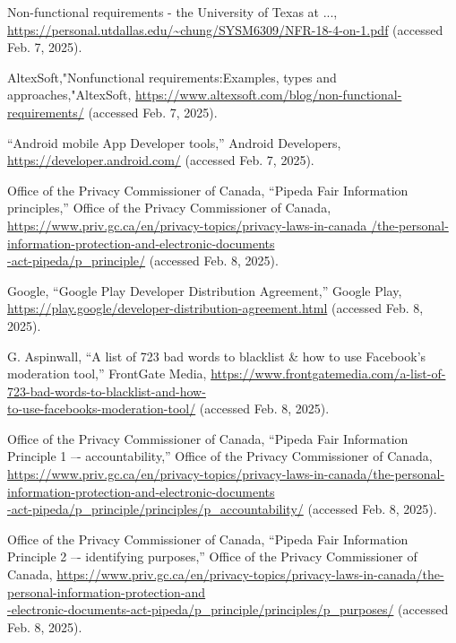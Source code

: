 \documentclass[]{article}
\begin{document}
\begin{thebibliography}{99}
     Non-functional requirements - the University of Texas at ..., 
    \url{https://personal.utdallas.edu/~chung/SYSM6309/NFR-18-4-on-1.pdf} 
    (accessed Feb. 7, 2025).
    
     AltexSoft,"Nonfunctional requirements:Examples, types and approaches,"AltexSoft, 
    \url{https://www.altexsoft.com/blog/non-functional-requirements/} 
    (accessed Feb. 7, 2025).
    
     “Android mobile App Developer tools,” Android Developers, 
    \url{https://developer.android.com/} 
    (accessed Feb. 7, 2025). 
    
     Office of the Privacy Commissioner of Canada, “Pipeda Fair Information principles,” Office of the Privacy Commissioner of Canada,  \url{https://www.priv.gc.ca/en/privacy-topics/privacy-laws-in-canada /the-personal-information-protection-and-electronic-documents}\\
    \url{-act-pipeda/p_principle/} 
    (accessed Feb. 8, 2025). 
    
      Google, “Google Play Developer Distribution Agreement,” Google Play,  
    \url{https://play.google/developer-distribution-agreement.html} 
    (accessed Feb. 8, 2025). 
    
     G. Aspinwall, “A list of 723 bad words to blacklist \& how to use Facebook’s moderation tool,” FrontGate Media,  
    \url{https://www.frontgatemedia.com/a-list-of-723-bad-words-to-blacklist-and-how-}\\
    \url{to-use-facebooks-moderation-tool/}
    (accessed Feb. 8, 2025). 
    
     Office of the Privacy Commissioner of Canada, “Pipeda Fair Information Principle 1 –- accountability,” Office of the Privacy Commissioner of Canada,
    \url{https://www.priv.gc.ca/en/privacy-topics/privacy-laws-in-canada/the-personal-information-protection-and-electronic-documents}\\
    \url{-act-pipeda/p_principle/principles/p_accountability/} 
    (accessed Feb. 8, 2025). 
   
     Office of the Privacy Commissioner of Canada, “Pipeda Fair Information Principle 2 –- identifying purposes,” Office of the Privacy Commissioner of Canada,  
    \url{https://www.priv.gc.ca/en/privacy-topics/privacy-laws-in-canada/the-personal-information-protection-and}\\
    \url{-electronic-documents-act-pipeda/p_principle/principles/p_purposes/} 
    (accessed Feb. 8, 2025). 
   

\end{thebibliography}
\end{document}

